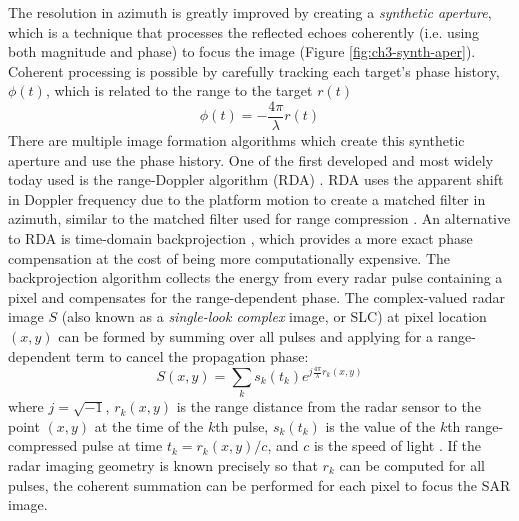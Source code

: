 The resolution in azimuth is greatly improved by creating a \emph{synthetic aperture}, which is a technique that processes the reflected echoes coherently (i.e. using both magnitude and phase) to focus the image (Figure \ref{fig:ch3-synth-aper}).
Coherent processing is possible by carefully tracking each target's phase history, $ \phi(t) $, which is related to the range to the target $r(t)$ 
\begin{equation}
\phi(t) = -\frac{4 \pi}{\lambda} r(t)  \label{eq:ch3-phase-range}
\end{equation}
There are multiple image formation algorithms which create this synthetic aperture and use the phase history. One of the first developed and most widely today used is the range-Doppler algorithm (RDA) \citep{Wu1976DigitalSystemProduce, Cumming1979DigitalProcessingSeasat}. 
RDA uses the apparent shift in Doppler frequency due to the platform motion to create a matched filter in azimuth, similar to the matched filter used for range compression \cite{Cumming2004DigitalProcessingSynthetic}.
An alternative to RDA is time-domain backprojection \citep{Duersch2013BackprojectionSyntheticAperture}, which provides a more exact phase compensation at the cost of being more computationally expensive.
The backprojection algorithm collects the energy from every radar pulse containing a pixel and compensates for the range-dependent phase.
The complex-valued radar image $S$ (also known as a \emph{single-look complex} image, or SLC) at pixel location $ (x, y) $ can be formed by summing over all pulses and applying for a range-dependent term to cancel the propagation phase:
\begin{equation}
	S(x, y) = \sum_{k} s_k \left(t_k \right) e^{j \frac{4 \pi}{\lambda} r_k(x, y)}
\end{equation}
where $j = \sqrt{-1}$, $r_k(x, y)$ is the range distance from the radar sensor to the point $ (x, y) $ at the time of the $k$th pulse, $s_k(t_k)$ is the value of the $k$th range-compressed pulse at time $t_k = r_k(x, y) / c$, and $c$ is the speed of light \citep{Zebker2018InsarMissionLevel}.
If the radar imaging geometry is known precisely so that $r_k$ can be computed for all pulses, the coherent summation can be performed for each pixel to focus the SAR image.

